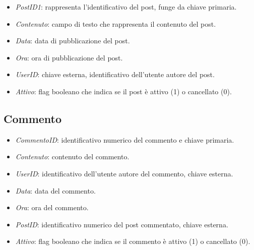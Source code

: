 \documentclass[paper=a4, fontsize=11pt,x11names]{report}
\newcommand{\key}[1]{\underline{#1}}
\begin{document}
\begin{itemize}
\item \textit{PostID1}: rappresenta l'identificativo del post, funge da chiave primaria.
\item \textit{Contenuto}: campo di testo che rappresenta il contenuto del post.
\item \textit{Data}: data di pubblicazione del post.
\item \textit{Ora}: ora di pubblicazione del post.
\item \textit{UserID}: chiave esterna, identificativo dell'utente autore del post.
\item \textit{Attivo}: flag booleano che indica se il post è attivo (1) o cancellato (0).
\end{itemize}

\subsection{Commento}
\begin{center}
\vspace{0.5cm}
\vspace{0.5cm}
\end{center}

\begin{itemize}
\item \textit{CommentoID}: identificativo numerico del commento e chiave primaria.
\item \textit{Contenuto}: contenuto del commento.
\item \textit{UserID}: identificativo dell'utente autore del commento, chiave esterna.
\item \textit{Data}: data del commento.
\item \textit{Ora}: ora del commento.
\item \textit{PostID}: identificativo numerico del post commentato, chiave esterna.
\item \textit{Attivo}: flag booleano che indica se il commento è attivo (1) o cancellato (0).
\end{itemize}
\end{document}
